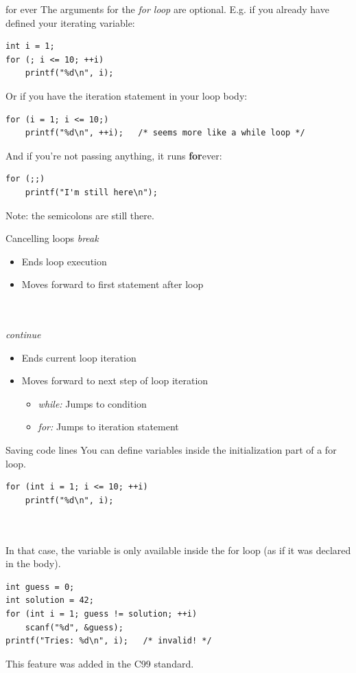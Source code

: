 \begin{frame}[fragile]{for ever}
	The arguments for the \textit{for loop} are optional. E.g. if you already have defined your iterating variable:
	\begin{lstlisting}[numbers=none]
int i = 1;
for (; i <= 10; ++i)
	printf("%d\n", i);
\end{lstlisting}
	Or if you have the iteration statement in your loop body:
	\begin{lstlisting}[numbers=none]
for (i = 1; i <= 10;)
	printf("%d\n", ++i);   /* seems more like a while loop */
\end{lstlisting}
	And if you're not passing anything, it runs \textbf{for}ever:
	\begin{lstlisting}[numbers=none]
for (;;)
	printf("I'm still here\n");
\end{lstlisting}
Note: the semicolons are still there.
\end{frame}

\begin{frame}{Cancelling loops}
	\textit{break}
	\begin{itemize}
		\item Ends loop execution
		\item Moves forward to first statement after loop
	\end{itemize}\ \\\ \\
	\textit{continue}
	\begin{itemize}
		\item Ends current loop iteration
		\item Moves forward to next step of loop iteration
		\begin{itemize}
			\item\textit{while:} Jumps to condition
			\item\textit{for:} Jumps to iteration statement
		\end{itemize}
	\end{itemize}
\end{frame}

\begin{frame}[fragile]{Saving code lines}
	You can define variables inside the initialization part of a for loop.
	\begin{lstlisting}[numbers=none]
for (int i = 1; i <= 10; ++i)
	printf("%d\n", i);
\end{lstlisting}
	\ \\\ \\In that case, the variable is only available inside the for loop (as if it was declared in the body).\\
	\begin{lstlisting}
int guess = 0;
int solution = 42;
for (int i = 1; guess != solution; ++i)
	scanf("%d", &guess);
printf("Tries: %d\n", i);   /* invalid! */
\end{lstlisting}
	This feature was added in the C99 standard.
\end{frame}

